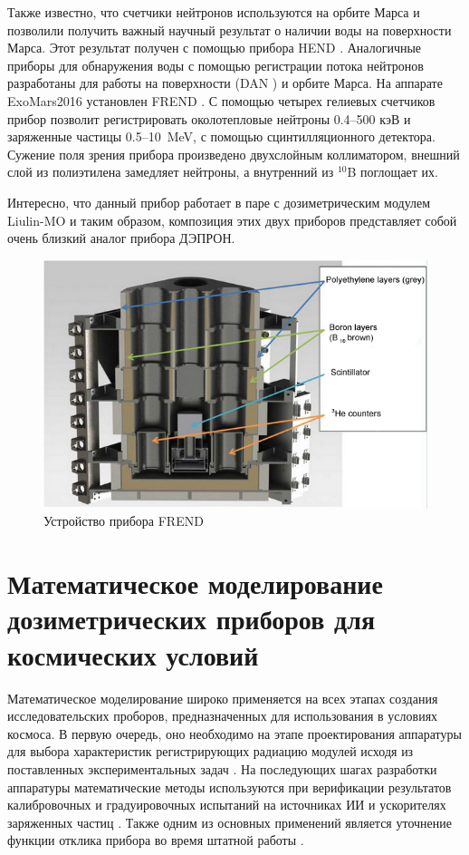 Также известно, что счетчики нейтронов используются на орбите Марса и позволили получить важный научный результат о наличии воды на поверхности Марса.  Этот  результат получен с помощью прибора HEND \cite{Feldman2004}. Аналогичные приборы для обнаружения воды с помощью регистрации потока нейтронов разработаны для работы на поверхности (DAN \cite{Mitrofanov2012a}) и орбите Марса. На аппарате ExoMars2016 установлен FREND \cite{Mitrofanov2012}. С помощью четырех гелиевых счетчиков прибор позволит регистрировать околотепловые нейтроны 0.4–500 кэВ и заряженные частицы 0.5–10~MeV, с помощью сцинтилляционного детектора. Сужение поля зрения прибора произведено двухслойным коллиматором, внешний слой из полиэтилена замедляет нейтроны, а внутренний из $^10$B поглощает их. 

Интересно, что данный прибор работает в паре с дозиметрическим модулем Liulin-MO и таким образом, композиция этих двух приборов представляет собой очень близкий аналог прибора ДЭПРОН.
\begin{figure}
	\centering
	\includegraphics[width=0.7\linewidth]{images/frend3-eng}
	\caption{Устройство прибора FREND \cite{Mitrofanov2012}}
	\label{fig:frend3-eng}
\end{figure}

\section{Математическое моделирование дозиметрических приборов для космических условий}

Математическое моделирование широко применяется на всех этапах создания исследовательских проборов, предназначенных для использования в условиях космоса. В первую очередь, оно необходимо на этапе проектирования аппаратуры для выбора характеристик регистрирующих радиацию модулей исходя из поставленных экспериментальных задач \cite{Hassler2008}. На последующих шагах разработки аппаратуры математические методы используются при верификации результатов калибровочных и градуировочных испытаний на источниках ИИ и ускорителях заряженных частиц \cite{Zeitlin2010, Luszik-Bhadra2008} . Также одним из основных применений является уточнение функции отклика прибора во время штатной работы \cite{Zeitlin2010}. 

